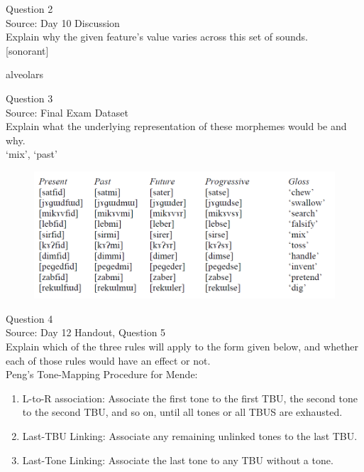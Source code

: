 \documentclass[12pt]{article}
\begin{document}
\newpage

{\large Question 2}\\

Source: Day 10 Discussion\\

Explain why the given feature's value varies across this set of sounds.\\

{[sonorant]}

alveolars


\newpage

{\large Question 3}\\

Source: Final Exam Dataset\\

Explain what the underlying representation of these morphemes would be and why.\\

`mix', `past'

\begin{figure}[H]
\includegraphics{../images/final_dataset.png}
\end{figure}

\newpage

{\large Question 4}\\

Source: Day 12 Handout, Question 5\\

Explain which of the three rules will apply to the form given below, and whether each of those rules would have an effect or not.\\

Peng’s Tone-Mapping Procedure for Mende: \begin{enumerate} \item L-to-R association: Associate the first tone to the first TBU, the second tone to the second TBU, and so on, until all tones or all TBUS are exhausted. \item Last-TBU Linking: Associate any remaining unlinked tones to the last TBU. \item Last-Tone Linking: Associate the last tone to any TBU without a tone. \end{enumerate}
\end{document}
